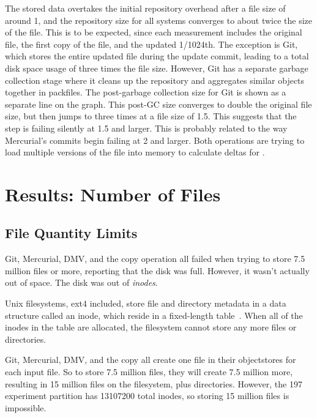 The stored data overtakes the initial \gls{repository} overhead after a file
size of around \SI{1}{\mib}, and the \gls{repository} size for all systems
converges to about twice the size of the file. This is to be expected, since
each measurement includes the original file, the first copy of the file, and the
updated \num{1/1024}th. The exception is Git, which stores the entire updated
file during the update \gls{commit}, leading to a total disk space usage of
three times the file size. However, Git has a separate garbage collection stage
where it cleans up the \gls{repository} and aggregates similar objects together
in \glspl{packfile}. The post-garbage collection size for Git is shown as a
separate line on the graph. This post-GC size converges to double the original
file size, but then jumps to three times at a file size of \SI{1.5}{\gib}. This
suggests that the  step is failing silently at
\SI{1.5}{\gib} and larger. This is probably related to the way Mercurial's
\glspl{commit} begin failing at \SI{2}{\gib} and larger. Both operations are
trying to load multiple versions of the file into memory to calculate deltas for
.

%


\cleardoublepage

\section{Results: Number of Files}
\label{results-num-files}

\subsection{File Quantity Limits}

Git, Mercurial, DMV, and the copy operation all failed when trying to store
\num{7.5} million files or more, reporting that the disk was full. However, it
wasn't actually out of space. The disk was out of \emph{\glspl{inode}}.


Unix filesystems, ext4 included, store file and directory metadata in a data
structure called an \gls{inode}, which reside in a fixed-length
table~\cite{unix_timesharing_system}. When all of the \glspl{inode} in the table
are allocated, the filesystem cannot store any more files or directories.

Git, Mercurial, DMV, and the copy all create one file in their
\glspl{objectstore} for each input file. So to store \num{7.5} million files,
they will create \num{7.5} million more, resulting in \num{15} million files on
the filesystem, plus directories. However, the \SI{197}{\gib} experiment
partition has \num{13107200} total \glspl{inode}, so storing \num{15} million
files is impossible.

